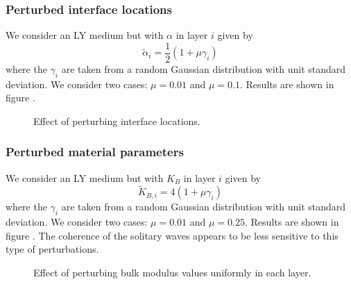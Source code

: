 \subsubsection{Perturbed interface locations}
  We consider an LY medium but with $\alpha$ in layer $i$ given by
  \[\tilde{\alpha}_i = \frac{1}{2}(1+\mu \gamma_i)\]
  where the $\gamma_i$ are taken from a random Gaussian distribution
  with unit standard deviation.  We consider two cases: $\mu=0.01$
  and $\mu=0.1$.  Results are shown in figure .

  \begin{figure}  
  \caption{Effect of perturbing interface locations.\label{fig:randint}}
  \end{figure}

\subsubsection{Perturbed material parameters}
  We consider an LY medium but with $K_B$ in layer $i$ given by
  \[\tilde{K}_{B,i} = 4(1+\mu \gamma_i)\]
  where the $\gamma_i$ are taken from a random Gaussian distribution
  with unit standard deviation.  We consider two cases: $\mu=0.01$
  and $\mu=0.25$.  Results are shown in figure .  The
  coherence of the solitary waves appears to be less sensitive to
  this type of perturbations.

  \begin{figure}  
  \caption{Effect of perturbing bulk modulus values uniformly in each layer.\label{fig:randK}}
  \end{figure}



